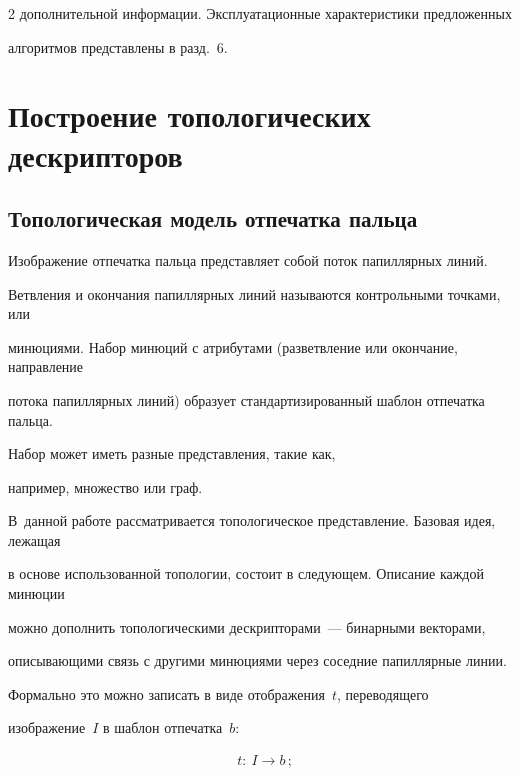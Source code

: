 \begin{multicols}{2}
дополнительной информации. Эксплуатационные характеристики предложенных 

алгоритмов представлены в разд.~6.



\section{Построение топологических дескрипторов}



\subsection{Топологическая модель отпечатка пальца}

      

      Изображение отпечатка пальца представляет собой поток папиллярных линий. 

Ветвления и окончания папиллярных линий называются контрольными точками, или 

минюциями. Набор \mbox{минюций} с атрибутами (разветвление или окончание, на\-прав\-ле\-ние 

потока папиллярных линий) образует стандартизированный шаблон отпечатка пальца. 

Набор может иметь разные представления, такие как,

 например, множество или граф. 

В~данной работе рассматривается топологическое представление. Базовая идея, лежащая 

в основе использованной топологии, состоит в следующем. Описание каж\-дой минюции 

можно дополнить топологическими дескрипторами~--- бинарными векторами, 

опи\-сы\-ва\-ющи\-ми связь с другими минюциями через соседние папиллярные линии. 

      



      

      Формально это можно записать в виде отображения~$t$, переводящего 

изображение~$I$ в шаблон отпечатка~$b$:



\noindent

      \begin{align*}

      &t:\ I\rightarrow b\,; %

      \\


\end{align*}
\end{multicols}
